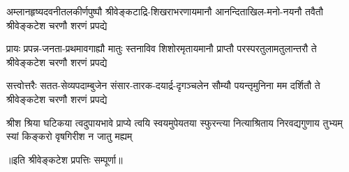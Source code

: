 \begin{AutoCols}[\maxColumns]
\fourlineindentedshloka
{अम्लानहृष्यदवनीतलकीर्णपुष्पौ}
{श्रीवेङ्कटाद्रि-शिखराभरणायमानौ}
{आनन्दिताखिल-मनो-नयनौ तवैतौ}
{श्रीवेङ्कटेश चरणौ शरणं प्रपद्ये}

\fourlineindentedshloka
{प्रायः प्रपन्न-जनता-प्रथमावगाह्यौ}
{मातुः स्तनाविव शिशोरमृतायमानौ}
{प्राप्तौ परस्परतुलामतुलान्तरौ ते}
{श्रीवेङ्कटेश चरणौ शरणं प्रपद्ये}

\fourlineindentedshloka
{सत्त्वोत्तरैः सतत-सेव्यपदाम्बुजेन}
{संसार-तारक-दयार्द्र-दृगञ्चलेन}
{सौम्यौ पयन्तृमुनिना मम दर्शितौ ते}
{श्रीवेङ्कटेश चरणौ शरणं प्रपद्ये}

\fourlineindentedshloka
{श्रीश श्रिया घटिकया त्वदुपायभावे}
{प्राप्ये त्वयि स्वयमुपेयतया स्फुरन्त्या}
{नित्याश्रिताय निरवद्यगुणाय तुभ्यम्}
{स्यां किङ्करो वृषगिरीश न जातु मह्यम्}

\end{AutoCols}

॥इति श्रीवेङ्कटेश प्रपत्तिः सम्पूर्णा॥